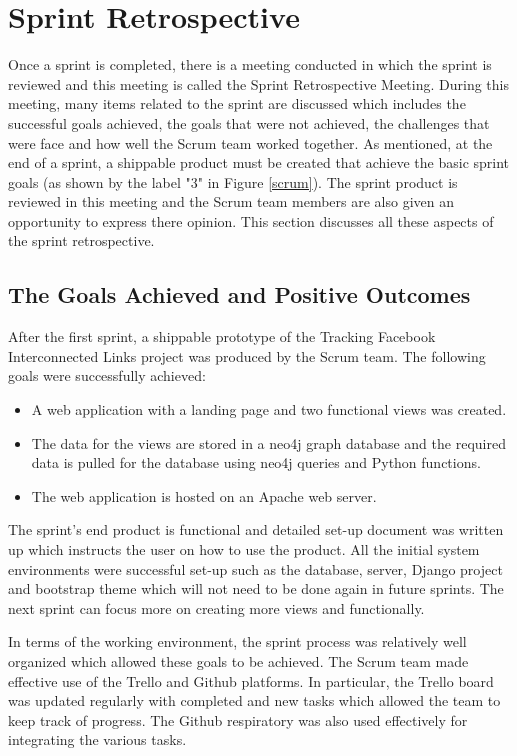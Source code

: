\documentclass[12pt,onecolumn]{article}
\begin{document}
	\section{Sprint Retrospective} \label{retro}
	Once a sprint is completed, there is a meeting conducted in which the sprint is reviewed and this meeting is called the Sprint Retrospective Meeting. During this meeting, many items related to the sprint are discussed which includes the successful goals achieved, the goals that were not achieved, the challenges that were face and how well the Scrum team worked together. As mentioned, at the end of a sprint, a shippable product must be created that achieve the basic sprint goals (as shown by the label "3" in Figure \ref{scrum}). The sprint product is reviewed in this meeting and the Scrum team members are also given an opportunity to express there opinion. This section discusses all these aspects of the sprint retrospective.
	
	\subsection{The Goals Achieved and Positive Outcomes}
	After the first sprint, a shippable prototype of the Tracking Facebook Interconnected Links project was produced by the Scrum team. The following goals were successfully achieved:
	
	\begin{itemize}
		\item A web application with a landing page and two functional views was created.
		\item The data for the views are stored in a neo4j graph database and the required data is pulled for the database using neo4j queries and Python functions.
		\item The web application is hosted on an Apache web server.
	\end{itemize}
	
	The sprint's end product is functional and detailed set-up document was written up which instructs the user on how to use the product. All the initial system environments were successful set-up such as the database, server, Django project and bootstrap theme which will not need to be done again in future sprints. The next sprint can focus more on creating more views and functionally. 
	
	In terms of the working environment, the sprint process was relatively well organized which allowed these goals to be achieved. The Scrum team made effective use of the Trello and Github platforms. In particular, the Trello board was updated regularly with completed and new tasks which allowed the team to keep track of progress. The Github respiratory was also used effectively for integrating the various tasks.
	
\end{document}
